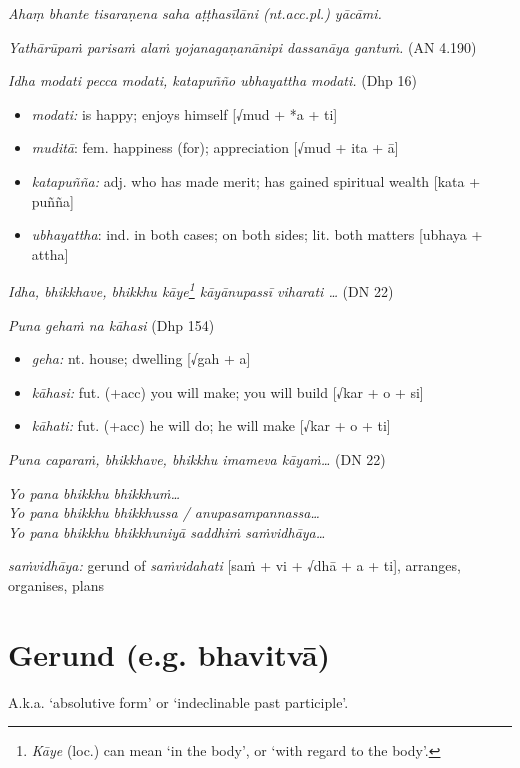 \documentclass[11pt,oneside]{memoir}
\begin{document}
\emph{Ahaṃ bhante tisaraṇena saha aṭṭhasīlāni (nt.acc.pl.) yācāmi.}

\emph{Yathārūpaṁ parisaṁ alaṁ yojanagaṇanānipi dassanāya gantuṁ.} (AN 4.190)

\emph{Idha modati pecca modati, katapuñño ubhayattha modati.} (Dhp 16)

\begin{itemize}
\item \emph{modati:} is happy; enjoys himself [√mud + *a + ti]
\item \emph{muditā}: fem. happiness (for); appreciation [√mud + ita + ā]
\item \emph{katapuñña:} adj. who has made merit; has gained spiritual wealth [kata + puñña]
\item \emph{ubhayattha}: ind. in both cases; on both sides; lit. both matters [ubhaya + attha]
\end{itemize}

\emph{Idha, bhikkhave, bhikkhu kāye\footnote{\emph{Kāye} (loc.) can mean `in the body', or `with regard to the body'.} kāyānupassī viharati \ldots{}} (DN 22)

\emph{Puna gehaṁ na kāhasi} (Dhp 154)

\begin{itemize}
\item \emph{geha:} nt. house; dwelling [√gah + a]
\item \emph{kāhasi:} fut. (+acc) you will make; you will build [√kar + o + si]
\item \emph{kāhati:} fut. (+acc) he will do; he will make [√kar + o + ti]
\end{itemize}

\emph{Puna caparaṁ, bhikkhave, bhikkhu imameva kāyaṁ\ldots{}} (DN 22)

\emph{Yo pana bhikkhu bhikkhuṁ\ldots{}} \\[0pt]
\emph{Yo pana bhikkhu bhikkhussa / anupasampannassa\ldots{}} \\[0pt]
\emph{Yo pana bhikkhu bhikkhuniyā saddhiṁ saṁvidhāya\ldots{}}

\emph{saṁvidhāya:} gerund of \emph{saṁvidahati} [saṁ + vi + √dhā + a + ti], arranges, organises, plans

\clearpage

\section{Gerund (e.g. bhavitvā)}
\label{sec:org643978f}

A.k.a. `absolutive form' or `indeclinable past participle'.
\end{document}
